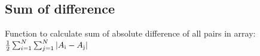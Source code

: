 \subsection{Sum of difference}

Function to calculate sum of absolute difference of all pairs in array: $ \frac{1}{2} \sum_{i=1}^{N}\sum_{j=1}^{N} |A\textsubscript{i} - A\textsubscript{j}|$
